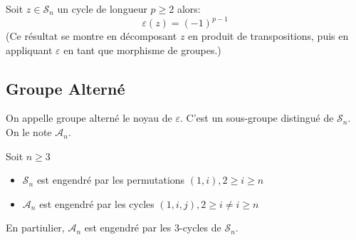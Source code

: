 \begin{prop}
	Soit $z \in \mathcal{S}_n$ un cycle de longueur $p \geq 2$ alors:
		\[ \varepsilon(z) = {(-1)}^{p-1} \]
	(Ce résultat se montre en décomposant $z$ en produit de transpositions, puis en appliquant $\varepsilon$ en tant que morphisme de groupes.)
\end{prop}

\subsection{Groupe Alterné}

\begin{definition}
	On appelle groupe alterné le noyau de $\varepsilon$. C'est un sous-groupe distingué de $\mathcal{S}_n$.
	On le note $\mathcal{A}_n$.
\end{definition}

\begin{prop}
	Soit $n \geq 3$
	\begin{itemize}
		\item $\mathcal{S}_n$ est engendré par les permutations $(1,i), 2 \geq i \geq n$ 
		\item $\mathcal{A}_n$ est engendré par les cycles $(1,i,j), 2 \geq i \not = i \geq n $
	\end{itemize}
	En partiulier, $\mathcal{A}_n$ est engendré par les 3-cycles de $\mathcal{S}_n$.
\end{prop}
